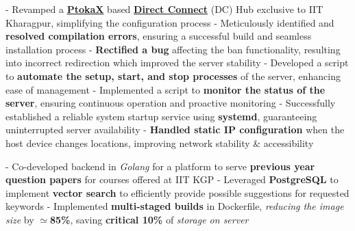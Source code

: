 \documentclass[a4paper,10pt]{extarticle} %
\begin{document}
\begin{description}[style=nextline, font=$\bullet$\hspace{2mm}\normalsize]
\item[{\href{https://github.com/proffapt/Metahub}{Metahub}} | C, Networking, Bash, systemd ]
- Revamped a \href{http://www.ptokax.org/}{\textbf{PtokaX}} based \href{https://en.wikipedia.org/wiki/Direct_Connect_(protocol)}{\textbf{Direct Connect}} (DC) Hub exclusive to IIT Kharagpur, simplifying the configuration process \newline
- Meticulously identified and \textbf{resolved compilation errors}, ensuring a successful build and seamless installation process \newline
- \textbf{Rectified a bug} affecting the ban functionality, resulting into incorrect redirection which improved the server stability \newline
- Developed a script to \textbf{automate the setup, start, and stop processes} of the server, enhancing ease of management \newline
- Implemented a script to \textbf{monitor the status of the server}, ensuring continuous operation and proactive monitoring \newline
- Successfully established a reliable system startup service using \textbf{systemd}, guaranteeing uninterrupted server availability \newline
- \textbf{Handled static IP configuration} when the host device changes locations, improving network stability \& accessibility

\item[{\href{https://qp.metakgp.org}{Intelligent Question Paper Search}} | Golang, Docker, PostgreSQL, GitHub Actions]
- Co-developed backend in \textit{Golang} for a platform to serve \textbf{previous year question papers} for courses offered at IIT KGP \newline
- Leveraged \textbf{PostgreSQL} to implement \textbf{vector search} to efficiently provide possible suggestions for requested keywords \newline
- Implemented \textbf{multi-staged builds} in Dockerfile, \textit{reducing the image size} by \textbf{$\simeq$85\%}, saving \textbf{critical 10\%} of \textit{storage on server}


\end{description}
\end{document}

